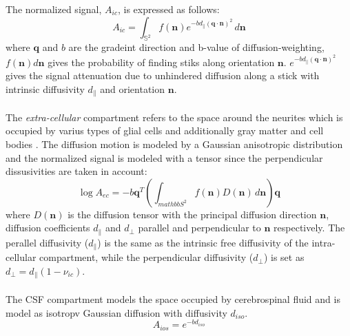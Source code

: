  The normalized signal, $A_{ic}$, is expressed as follows:
 \begin{equation}
   A_{ic} = \int_{\mathbb{S}^2} f(\mathbf{n})e^{-bd_{\parallel}(\mathbf{q\cdot n})^2} \,d\mathbf{n}
 \end{equation}
 where $\mathbf{q}$ and $b$ are the gradeint direction and b-value of diffusion-weighting, $f(\mathbf{n})d\mathbf{n}$ gives the probability of finding stiks along orientation $\mathbf{n}$. $e^{-bd_{\parallel}(\mathbf{q\cdot n})^2}$ gives the signal attenuation due to unhindered diffusion along a stick with intrinsic diffusivity $d_{\parallel}$ and orientation $\mathbf{n}$.
 \\\\
 The \emph{extra-cellular} compartment refers to the space around the neurites which is occupied by varius types of glial cells and additionally gray matter and cell bodies \cite{zhang2012noddi}. The diffusion motion is modeled by a Gaussian anisotropic distribution and the normalized signal is modeled with a tensor since the perpendicular dissusivities are taken in account:
 \begin{equation}
   \log A_{ec} = -b\mathbf{q}^T(\int_{mathbb{S}^2} f(\mathbf{n})D(\mathbf{n})\,d\mathbf{n})\mathbf{q}
 \end{equation}
 where $D(\mathbf{n})$ is the diffusion tensor with the principal diffusion direction $\mathbf{n}$, diffusion coefficients $d_{\parallel}$ and $d_{\perp}$ parallel and perpendicular to $\mathbf{n}$ respectively. The perallel diffusivity ($d_{\parallel}$) is the same as the intrinsic free diffusivity of the intra-cellular compartment, while the perpendicular diffusivity ($d_{\perp}$) is set as $d_{\perp} = d_{\parallel}(1-\nu_{ic})$.
 \\\\
 The CSF compartment models the space occupied by cerebrospinal fluid and is model as isotropv Gaussian diffusion with diffusivity $d_{iso}$.
 \begin{equation}
   A_{ios} = e^{-b d_{iso}}
 \end{equation}
